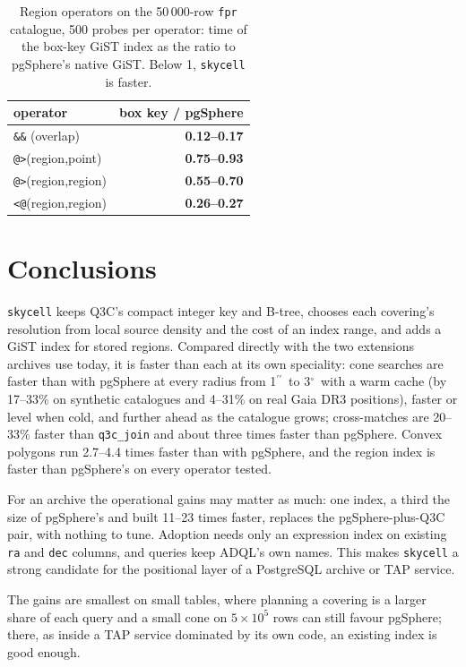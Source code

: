 \documentclass[final,5p,times,twocolumn,authoryear]{elsarticle}
\newcommand{\arcsec}{\ensuremath{^{\prime\prime}}}
\newcommand{\degr}{\ensuremath{^{\circ}}}
\begin{document}
\begin{table}
  \caption{Region operators on the 50\,000-row \texttt{fpr} catalogue, 500 probes per
    operator: time of the box-key GiST index as the ratio to pgSphere's native GiST.
    Below 1, \texttt{skycell} is faster.}
  \label{tab:gistregion}
  \centering
  \footnotesize
  \begin{tabular}{l r}
    \hline\hline
    operator & box key / pgSphere \\
    \hline
    \texttt{\&\&} (overlap) & \textbf{0.12--0.17} \\
    \texttt{@>}(region,point) & \textbf{0.75--0.93} \\
    \texttt{@>}(region,region) & \textbf{0.55--0.70} \\
    \texttt{<@}(region,region) & \textbf{0.26--0.27} \\
    \hline
  \end{tabular}
\end{table}

\section{Conclusions}
\label{sec:conclusions}

\texttt{skycell} keeps Q3C's compact integer key and B-tree, chooses each covering's
resolution from local source density and the cost of an index range, and adds a GiST
index for stored regions. Compared directly with the two extensions archives use today,
it is faster than each at its own speciality: cone searches are faster than with
pgSphere at every radius from 1\arcsec\ to 3\degr\ with a warm cache (by 17--33\% on
synthetic catalogues and 4--31\% on real Gaia DR3 positions), faster or level when cold,
and further ahead as the catalogue grows; cross-matches are 20--33\% faster than
\texttt{q3c\_join} and about three times faster than pgSphere. Convex polygons run
2.7--4.4 times faster than with pgSphere, and the region index is faster than
pgSphere's on every operator tested.

For an archive the operational gains may matter as much: one index, a third the size of
pgSphere's and built 11--23 times faster, replaces the pgSphere-plus-Q3C pair, with
nothing to tune. Adoption needs only an expression index on existing \texttt{ra} and
\texttt{dec} columns, and queries keep ADQL's own names. This makes \texttt{skycell} a
strong candidate for the positional layer of a PostgreSQL archive or TAP service.

The gains are smallest on small tables, where planning a covering is a larger share of
each query and a small cone on $5\times10^5$ rows can still favour pgSphere; there, as
inside a TAP service dominated by its own code, an existing index is good enough.
\end{document}
